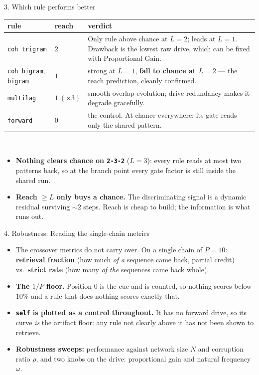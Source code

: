 \documentclass[aspectratio=169]{beamer}
\begin{document}
\begin{frame}{3. Which rule performs better}
  \centering\footnotesize
  \begin{tabular}{llp{6.6cm}}
    \toprule
    rule & reach & verdict \\
    \midrule
    \texttt{coh trigram} & $2$ & Only rule above chance at $L = 2$; leads
      at $L = 1$. Drawback is the lowest raw drive, which can be fixed with Proportional Gain. \\
    \texttt{coh bigram}, \texttt{bigram} & $1$ & strong at $L = 1$, \textbf{fall to chance at
      $L = 2$} --- the reach prediction, cleanly confirmed. \\
    \texttt{multilag} & $1\ (\times 3)$ & smooth overlap evolution; drive redundancy makes it degrade gracefully. \\
    \texttt{forward} & $0$ & the control. At chance everywhere: its gate reads only the
      shared pattern. \\
    \bottomrule
  \end{tabular}
  \\[3mm]
  \begin{itemize}\small
    \item \textbf{Nothing clears chance on \texttt{2-3-2}} ($L = 3$): every rule reads at most
      two patterns back, so at the branch point every gate factor is still inside the shared run.
    \item \textbf{Reach $\ge L$ only buys a chance.} The discriminating signal is a dynamic
      residual surviving $\sim 2$ steps. Reach is cheap to build; the information is what runs out.
  \end{itemize}
\end{frame}

\begin{frame}{4. Robustness: Reading the single-chain metrics}
  \begin{itemize}\small
    \item The crossover metrics do not carry over. On a single chain of $P = 10$:
      \textbf{retrieval fraction} (how much \emph{of a} sequence came back, partial credit)
      vs.\ \textbf{strict rate} (how many \emph{of the} sequences came back whole).
    \item \textbf{The $1/P$ floor.} Position $0$ is the cue and is counted, so nothing scores
      below $10\%$ and a rule that does nothing scores exactly that.
    \item \textbf{\texttt{self} is plotted as a control throughout.} It has no forward
      drive, so its curve \emph{is} the artifact floor: any rule not clearly above it has not
      been shown to retrieve.
    \item \textbf{Robustness sweeps:} performance against network size $N$ and corruption ratio $\rho$, and two knobs on the drive: proportional gain and natural frequency $\omega$.
  \end{itemize}
\end{frame}
\end{document}
